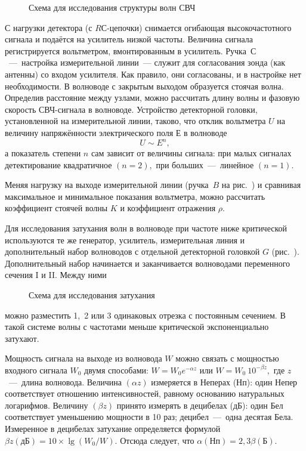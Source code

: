 \begin{figure}[h!]
    \caption{Схема для исследования структуры волн СВЧ} 
\end{figure}

С нагрузки детектора (с $RС$-цепочки) снимается огибающая высокочастотного
сигнала и подаётся на усилитель низкой частоты. Величина сигнала регистрируется
вольтметром, вмонтированным в усилитель. Ручка~$С$~---~настройка измерительной
линии~--- служит для согласования зонда (как антенны) со входом усилителя. Как
правило, они согласованы, и в настройке нет необходимости. В волноводе с
закрытым выходом образуется стоячая волна. Определив расстояние между узлами,
можно рассчитать длину волны и фазовую скорость СВЧ-сигнала в волноводе.
Устройство детекторной головки, установленной на измерительной линии, таково,
что отклик вольтметра $U$ на величину напряжённости электрического поля $Е$ в
волноводе \begin{equation*} U\sim E^{n}, \end{equation*} а показатель степени
$n$ сам зависит от величины сигнала: при малых сигналах детектирование
квадратичное $(n=2),$ при больших~---~линейное $(n=1).$

Меняя нагрузку на выходе измерительной линии (ручка~$B$ на рис.~) и сравнивая максимальное и минимальное показания вольтметра, можно
рассчитать коэффициент стоячей волны $K$ и коэффициент отражения $\rho.$


Для исследования затухания волн в волноводе при частоте ниже критической
используются те же генератор, усилитель, измерительная линия и дополнительный
набор волноводов с отдельной детекторной головкой $G$ (рис.~). Дополнительный набор начинается и заканчивается волноводами
переменного сечения I и II. Между ними

\begin{figure}[h!]
    \caption{Схема для исследования затухания} 
\end{figure}

можно разместить 1,~2 или 3 одинаковых отрезка с постоянным сечением. В такой
системе волны с частотами меньше критической экспоненциально затухают.

Мощность сигнала на выходе из волновода $W$ можно связать с мощностью входного
сигнала $W_0$ двумя способами: $W=W_0e^{-\alpha z}$ или $W=W_0~10^{-\beta z},$
где $z$~---~длина волновода. Величина $(\alpha z)$ измеряется в Неперах (Нп):
один Непер соответствует отношению интенсивностей, равному основанию натуральных
логарифмов. Величину $(\beta z)$ принято измерять в децибелах (дБ): один Бел
соответствует уменьшению мощности в 10 раз; децибел~---~одна десятая Бела.
Измеренное в децибелах затухание определяется формулой $\beta
z(\text{дБ})=10\times\lg(W_0/W).$ Отсюда следует, что
$\alpha(\text{Нп})=2,3\beta(\text{Б}).$


